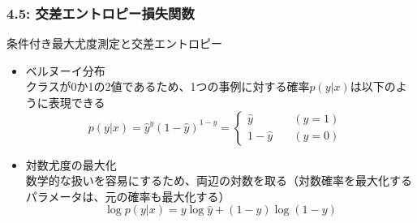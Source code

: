 \documentclass[unicode,11pt]{beamer} %
\begin{document}
\begin{frame}
    \frametitle{4.5: 交差エントロピー損失関数}
    \begin{alertblock}{条件付き最大尤度測定と交差エントロピー}
        \begin{itemize}
            \item ベルヌーイ分布\\クラスが0か1の2値であるため、1つの事例に対する確率$p(y|x)$は以下のように表現できる
            \begin{equation*}
                p(y|x) = \hat{y}^y(1-\hat{y})^{1-y}
                       = 
                       \left\{
                            \begin{alignedat}{2}
                                \hat{y}         \quad &(y = 1)& \\
                                1-\hat{y}       \quad &(y = 0)&
                            \end{alignedat}
                       \right.
            \end{equation*}
            \item 対数尤度の最大化\\数学的な扱いを容易にするため、両辺の対数を取る（対数確率を最大化するパラメータは、元の確率も最大化する）
            \begin{equation*}
                \log p(y|x) = y \log \hat{y} + (1-y) \log (1-y)
            \end{equation*}
        \end{itemize}
    \end{alertblock}
\end{frame}
\end{document}
